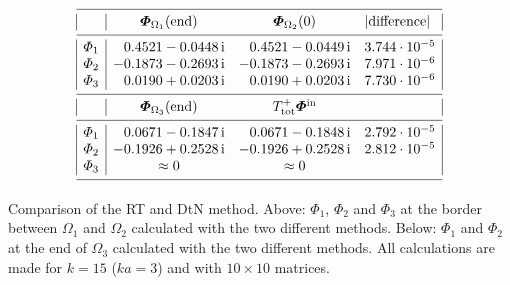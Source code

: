 \documentclass[numreferences]{kluwer}
\providecommand{\abs}[1]{\left\lvert#1\right\rvert}
\renewcommand{\Phi}{\varPhi}
\renewcommand{\vec}[1]{\bm{#1}}
\renewcommand{\i}{\,\mathrm{i}}
\renewcommand{\Phi}{\varPhi}
\newcommand{\Phiin}{\vec\Phi^{\text{in}}}
\newcommand{\Ttot}{T^+_{\text{tot}}}
\begin{document}

\begin{table}[ht]
  \begin{equation*}
    \begin{array}{|l|rrl|}
      \hline
      &\multicolumn1c{\vec\Phi_{\Omega_1}(\text{end})}
      &\multicolumn1c{\vec\Phi_{\Omega_2}(0)}
      &\abs{\text{difference}}\\
      \hline
      \Phi_1&0.4521-0.0448\i&0.4521-0.0449\i&3.744\cdot10^{-5}\\
      \Phi_2&-0.1873-0.2693\i&-0.1873-0.2693\i&7.971\cdot10^{-6}\\
      \Phi_3&0.0190+0.0203\i&0.0190+0.0203\i&7.730\cdot10^{-6}\\
      \hline 
      &\multicolumn1c{\vec\Phi_{\Omega_3}(\text{end})}
      &\multicolumn1c{\Ttot\Phiin}
      &\\
      \hline
      \Phi_1&0.0671-0.1847\i&0.0671-0.1848\i&2.792\cdot10^{-5}\\
      \Phi_2&-0.1926+0.2528\i&-0.1926+0.2528\i&2.812\cdot10^{-5}\\
      \Phi_3&\multicolumn1c{\approx0}&\multicolumn1c{\approx0}&\\
      \hline
    \end{array}
  \end{equation*}
  \caption{Comparison of the RT and DtN method. Above: $\Phi_1$,
    $\Phi_2$ and $\Phi_3$ at the border between $\Omega_1$ and $\Omega_2$
    calculated with the two different methods. Below: $\Phi_1$ and
    $\Phi_2$ at the end of $\Omega_3$ calculated with the two
    different methods. All calculations are made for $k=15$ ($ka=3$)
    and with $10\times10$ matrices.}
  \label{tab:phires-bcend}
  \tabwidth{\textwidth}
\end{table}
\end{document}
